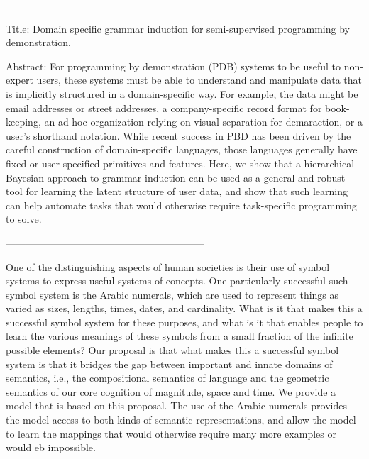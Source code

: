 \documentclass{article}
\begin{document}
-----------------------------------------------------------------

Title: Domain specific grammar induction for semi-supervised
programming by demonstration.

Abstract: For programming by demonstration (PDB) systems to be useful
to non-expert users, these systems must be able to understand and
manipulate data that is implicitly structured in a domain-specific
way. For example, the data might be email addresses or street
addresses, a company-specific record format for book-keeping, an ad
hoc organization relying on visual separation for demaraction, or a
user's shorthand notation. While recent success in PBD has been driven
by the careful construction of domain-specific languages, those
languages generally have fixed or user-specified primitives and
features. Here, we show that a hierarchical Bayesian approach to
grammar induction can be used as a general and robust tool for
learning the latent structure of user data, and show that such
learning can help automate tasks that would otherwise require
task-specific programming to solve.

------------------------------------------------------------

One of the distinguishing aspects of human societies is their use of
symbol systems to express useful systems of concepts. One particularly
successful such symbol system is the Arabic numerals, which are used
to represent things as varied as sizes, lengths, times, dates, and
cardinality. What is it that makes this a successful symbol system for
these purposes, and what is it that enables people to learn the
various meanings of these symbols from a small fraction of the
infinite possible elements? Our proposal is that what makes this a
successful symbol system is that it bridges the gap between important
and innate domains of semantics, i.e., the compositional semantics of
language and the geometric semantics of our core cognition of
magnitude, space and time. We provide a model that is based on this
proposal. The use of the Arabic numerals provides the model access to
both kinds of semantic representations, and allow the model to learn
the mappings that would otherwise require many more examples or would
eb impossible.
\end{document}
